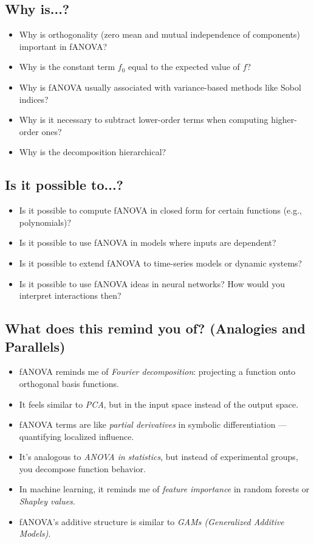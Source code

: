 \subsection*{Why is...?}
\begin{itemize}
    \item Why is orthogonality (zero mean and mutual independence of components) important in fANOVA?
    \item Why is the constant term \( f_0 \) equal to the expected value of \( f \)?
    \item Why is fANOVA usually associated with variance-based methods like Sobol indices?
    \item Why is it necessary to subtract lower-order terms when computing higher-order ones?
    \item Why is the decomposition hierarchical?
\end{itemize}

\subsection*{Is it possible to...?}
\begin{itemize}
    \item Is it possible to compute fANOVA in closed form for certain functions (e.g., polynomials)?
    \item Is it possible to use fANOVA in models where inputs are dependent?
    \item Is it possible to extend fANOVA to time-series models or dynamic systems?
    \item Is it possible to use fANOVA ideas in neural networks? How would you interpret interactions then?
\end{itemize}

\subsection*{What does this remind you of? (Analogies and Parallels)}
\begin{itemize}
    \item fANOVA reminds me of \emph{Fourier decomposition}: projecting a function onto orthogonal basis functions.
    \item It feels similar to \emph{PCA}, but in the input space instead of the output space.
    \item fANOVA terms are like \emph{partial derivatives} in symbolic differentiation — quantifying localized influence.
    \item It’s analogous to \emph{ANOVA in statistics}, but instead of experimental groups, you decompose function behavior.
    \item In machine learning, it reminds me of \emph{feature importance} in random forests or \emph{Shapley values}.
    \item fANOVA’s additive structure is similar to \emph{GAMs (Generalized Additive Models)}.
\end{itemize}

